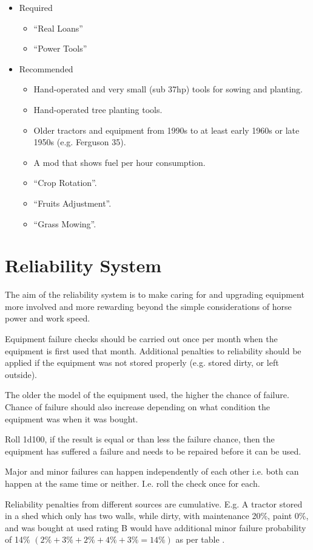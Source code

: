 \documentclass[a4paper,10pt]{article}
\begin{document}
\begin{itemize}
\item Required
  \begin{itemize}
  \item ``Real Loans''
  \item ``Power Tools''
  \end{itemize}
\item Recommended
  \begin{itemize}
    \item Hand-operated and very small (sub 37hp) tools for sowing and planting.
    \item Hand-operated tree planting tools.
    \item Older tractors and equipment from 1990s to at least early 1960s or
      late 1950s (e.g.  Ferguson 35).
    \item A mod that shows fuel per hour consumption.
    \item ``Crop Rotation''.
    \item ``Fruits Adjustment''.
    \item ``Grass Mowing''.
  \end{itemize}
\end{itemize}


\section{Reliability System}
The aim of the reliability system is to make caring for and upgrading equipment
more involved and more rewarding beyond the simple considerations of horse power
and work speed.

Equipment failure checks should be carried out once per month when the equipment
is first used that month. Additional penalties to reliability should be applied
if the equipment was not stored properly (e.g. stored dirty, or left outside).

The older the model of the equipment used, the higher the chance of failure.
Chance of failure should also increase depending on what condition the equipment
was when it was bought.

Roll 1d100, if the result is equal or than less the failure chance, then the
equipment has suffered a failure and needs to be repaired before it can be used.

Major and minor failures can happen independently of each other i.e. both can
happen at the same time or neither. I.e. roll the check once for each.

Reliability penalties from different sources are cumulative. E.g. A tractor
stored in a shed which only has two walls, while dirty, with maintenance 20\%,
paint 0\%, and was bought at used rating B would have additional minor failure
probability of 14\% $(2\% + 3\% + 2\% + 4\% + 3\% = 14\%)$ as per table
.
\end{document}
